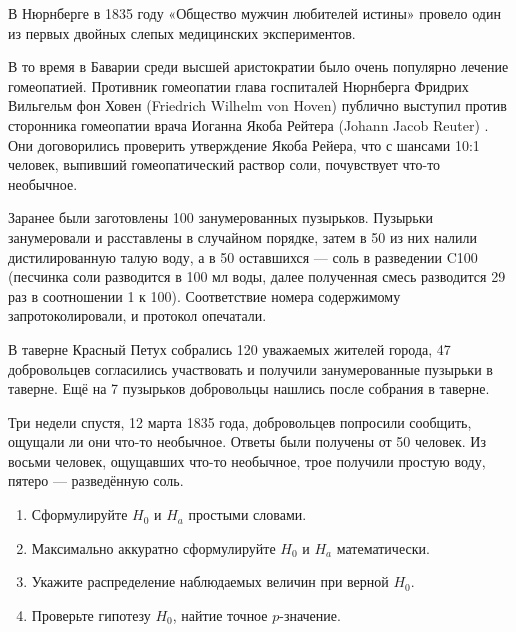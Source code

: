 \documentclass[12pt, a4paper]{article}
\newcounter{problem}[section]
\newenvironment{problem}%
{%
\refstepcounter{problem}%
     \hypertarget{problem:{\thesection.\theproblem}}{} %
     \Writetofile{solution_file}{\protect\hypertarget{soln:\thesection.\theproblem}{}}
     \begin{myenum}[label=\bfseries\protect\hyperlink{soln:\thesection.\theproblem}{\thesection.\theproblem},ref=\thesection.\theproblem]
     \item%
    }%
    {%
    \end{myenum}}
\begin{document}
\begin{problem}
  В Нюрнберге в 1835 году «Общество мужчин любителей истины» провело один из первых двойных слепых 
  медицинских экспериментов. 
  
  В то время в Баварии среди высшей аристократии было очень популярно лечение гомеопатией. 
  Противник гомеопатии глава госпиталей Нюрнберга Фридрих Вильгельм фон Ховен (Friedrich Wilhelm von Hoven)
  публично выступил против сторонника гомеопатии врача Иоганна Якоба Рейтера (Johann Jacob Reuter)
  .
  Они договорились проверить утверждение Якоба Рейера, что с шансами 10:1 человек, выпивший гомеопатический раствор соли, почувствует что-то необычное.
  
  Заранее были заготовлены 100 занумерованных пузырьков. 
  Пузырьки занумеровали и расставлены в случайном порядке, затем в 50 из них налили дистилированную
  талую воду, а в 50 оставшихся — соль в разведении C100 (песчинка соли разводится в 100 мл воды, 
  далее полученная смесь разводится 29 раз в соотношении 1 к 100). 
  Соответствие номера содержимому запротоколировали, и протокол опечатали. 
  
  В таверне Красный Петух собрались 120 уважаемых жителей города, 
  47 добровольцев согласились участвовать и получили занумерованные пузырьки в таверне. 
  Ещё на 7 пузырьков добровольцы нашлись после собрания в таверне. 
  
  Три недели спустя, 12 марта 1835 года, добровольцев попросили сообщить, ощущали ли они что-то необычное. 
  Ответы были получены от 50 человек. Из восьми человек, ощущавших что-то необычное,
  трое получили простую воду, пятеро — разведённую соль. 
  
  \begin{enumerate}
    \item Сформулируйте $H_0$ и $H_a$ простыми словами.
    \item Максимально аккуратно сформулируйте $H_0$ и $H_a$ математически. 
    \item Укажите распределение наблюдаемых величин при верной $H_0$. 
    \item Проверьте гипотезу $H_0$, найтие точное $p$-значение. 
  \end{enumerate}
  
    \begin{sol}
      
    \end{sol}
  \end{problem}
  
\end{document}
